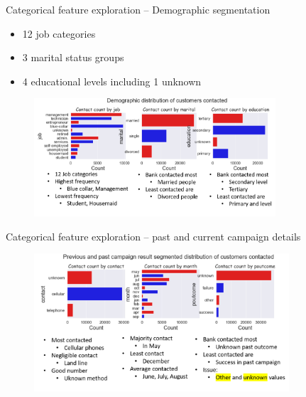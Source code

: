 \begin{frame}{Categorical feature exploration – Demographic segmentation}

\begin{itemize}
    \item 12 job categories
	\item 3 marital status groups
	\item 4 educational levels including 1 unknown
\end{itemize}

	\begin{figure}
		
		\includegraphics[width=9.0cm]{figures/fig_cat_demo_count.png}
	\end{figure}


\end{frame}

\begin{frame}{Categorical feature exploration – past and current campaign details}


	\begin{figure}
		
		\includegraphics[width=9.50cm]{figures/fig_cat_campaign_count.png}
	\end{figure}


\end{frame}


